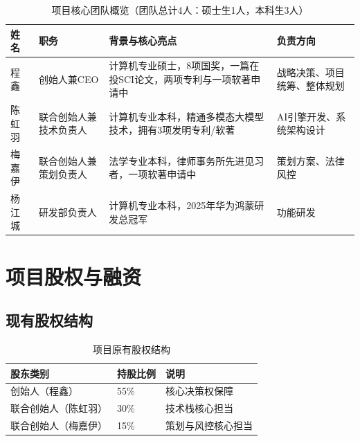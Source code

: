 \begin{table}[htbp]
  \centering
  \caption{项目核心团队概览（团队总计4人：硕士生1人，本科生3人）}
  \label{tab:team}
  \begin{tabular}{p{1.8cm}p{2.8cm}p{5.2cm}p{2.8cm}}
    \toprule
    \textbf{姓名}     & \textbf{职务}      & \textbf{背景与核心亮点}                         & \textbf{负责方向}        \\
    \midrule
    程鑫              & 创始人兼CEO        & 计算机专业硕士，8项国奖，一篇在投SCI论文，两项专利与一项软著申请中 & 战略决策、项目统筹、整体规划 \\
    陈虹羽            & 联合创始人兼技术负责人 & 计算机专业本科，精通多模态大模型技术，拥有3项发明专利/软著 & AI引擎开发、系统架构设计 \\
    梅嘉伊            & 联合创始人兼策划负责人 & 法学专业本科，律师事务所先进见习者，一项软著申请中       & 策划方案、法律风控       \\
    杨江城            & 研发部负责人              & 计算机专业本科，2025年华为鸿蒙研发总冠军              & 功能研发               \\

    \bottomrule
  \end{tabular}
\end{table}

\section{项目股权与融资}

\subsection{现有股权结构}

\begin{table}[htbp]
  \centering
  \caption{项目原有股权结构}
  \label{tab:equity}
  \begin{tabular}{p{4.5cm}p{2.5cm}p{5.5cm}}
    \toprule
    \textbf{股东类别}           & \textbf{持股比例} & \textbf{说明}              \\
    \midrule
    创始人（程鑫）              & 55\%             & 核心决策权保障             \\
    联合创始人（陈虹羽）         & 30\%             & 技术栈核心担当             \\
    联合创始人（梅嘉伊）         & 15\%             & 策划与风控核心担当         \\

    \bottomrule
  \end{tabular}
\end{table}

